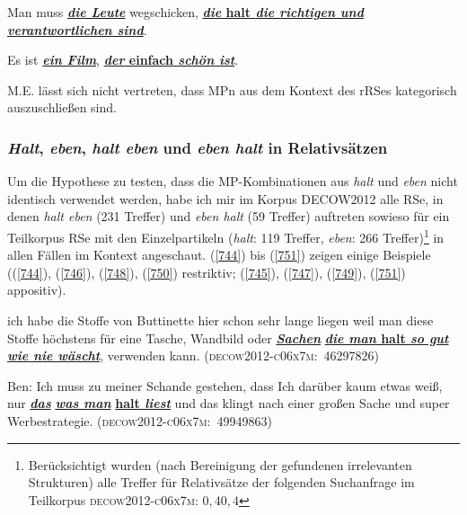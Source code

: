 \begin{exe}
	\ex\label{742} 
	Man muss \ul{\textit{\textbf{die Leute}}} wegschicken, \ul{\textbf{\textit{die} halt \textit{die richtigen und verantwortlichen sind}}}.
\end{exe}

\begin{exe}
	\ex\label{743} 
	Es ist \ul{\textit{\textbf{ein Film}}}, \ul{\textbf{\textit{der} einfach \textit{schön ist}}}.
\end{exe}
M.E. lässt sich nicht vertreten, dass MPn aus dem Kontext des rRSes kategorisch auszuschließen sind.

\subsubsection{\textit{Halt}, \textit{eben}, \textit{halt eben} und \textit{eben halt} in Relativsätzen}
Um die Hypothese zu testen, dass die MP-Kom\-bi\-na\-ti\-on\-en aus \textit{halt} und \textit{eben} nicht identisch verwendet werden, habe ich mir im Korpus DECOW2012 alle RSe, in denen \textit{halt eben} (231 Treffer) und \textit{eben halt} (59 Treffer) auftreten sowieso für ein Teilkorpus RSe mit den Einzelpartikeln (\textit{halt}: 119 Treffer, \textit{eben}: 266 Treffer)\footnote{Berücksichtigt wurden (nach Bereinigung der gefundenen irrelevanten Strukturen) alle Treffer für Relativsätze der folgenden Suchanfrage im Teilkorpus \textsc{decow2012-c06x7m:} {\ttfamily\relax [word= „der$\vert$das$\vert$den$\vert$die$\vert$der$\vert$dem$\vert$dessen$\vert$was$\vert$wo$\vert$wen$\vert$wer$\vert$wohin$\vert$welcher$\vert$welche$\vert$welches$\vert$wofür$\vert$wo\-durch$\vert$womit$\vert$woran“$][]\lbrace$0,4$\rbrace[$word=„halt“$][]\lbrace$0,4$\rbrace[$pos=„VVFIN“]}} in allen Fällen im Kontext angeschaut. (\ref{744}) bis (\ref{751}) zeigen einige Beispiele ((\ref{744}), (\ref{746}), (\ref{748}), (\ref{750}) restriktiv; (\ref{745}), (\ref{747}), (\ref{749}), (\ref{751}) appositiv).

\begin{exe}
	\ex\label{744} 
		\begin{xlist}
		\ex\label{744a} 
	
		ich habe die Stoffe von Buttinette hier schon sehr lange liegen weil man diese Stoffe höchstens für eine Tasche, Wandbild oder \ul{\textit{\textbf{Sachen}}} \ul{\textbf{\textit{die man} halt \textit{so gut wie nie wäscht}}}, verwenden kann. 
		\newline	
	 	\hbox{}\hfill\hbox{\scshape(decow2012-c06x7m: 46297826)}
	 	\newline
	 	\hbox{}\hfill\hbox{\citet[168]{Mueller2016a}}
	 	\ex\label{744b} 
	 
	 	Ben: Ich muss zu meiner Schande gestehen, dass Ich darüber kaum etwas weiß, nur \ul{\textbf{\textit{das}}} \ul{\textbf{\textit{was man}}} \ul{\textbf{halt \textit{liest}}} und das klingt nach einer großen Sache und super Werbestrategie.
	 	\newline\hbox{}\hfill\hbox{\scshape(decow2012-c06x7m: 49949863)}
		\end{xlist}
\end{exe}

